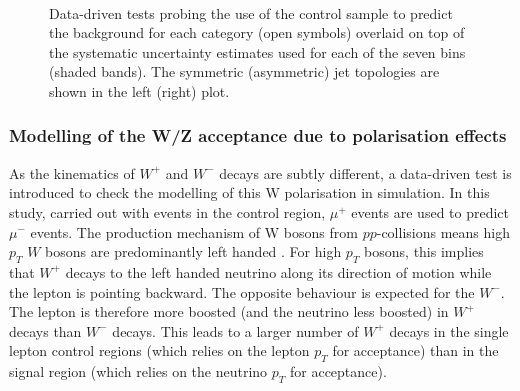 \begin{figure}[h!]
  \begin{center}
    ~~
    \caption{Data-driven tests probing the use of the \mj control sample
      to predict the \znunu background for each
      \njet category (open symbols) overlaid on top of the systematic
      uncertainty estimates used for each of the seven \scalht bins (shaded bands).  
      The symmetric (asymmetric) jet topologies are shown in the left (right) plot. 
    }
    \label{fig:closureMuToMuMu}
  \end{center} 
\end{figure}

\subsubsection*{Modelling of the W/Z acceptance due to polarisation effects}
\label{sec:tfSyst_Wpol}

As the kinematics of $W^+$ and $W^-$ decays are subtly different, a
data-driven test is introduced to check the modelling of this W
polarisation in simulation. In this study, carried out with events in
the \mj control region, $\mu^{+}$ events are used to predict $\mu^{-}$
events.  The production mechanism of W bosons from $pp$-collisions means
high $p_T$ $W$ bosons are predominantly left handed \cite{WPol}.  For
high $p_T$ bosons, this implies that $W^+$ decays to the left handed
neutrino along its direction of motion while the lepton is pointing
backward.  The opposite behaviour is expected for the $W^-$. The
lepton is therefore more boosted (and the neutrino less boosted) in
$W^+$ decays than $W^-$ decays.  This leads to a larger number of
$W^+$ decays in the single lepton control regions (which relies on the
lepton $p_T$ for acceptance) than in the signal region (which relies
on the neutrino $p_T$ for acceptance).

